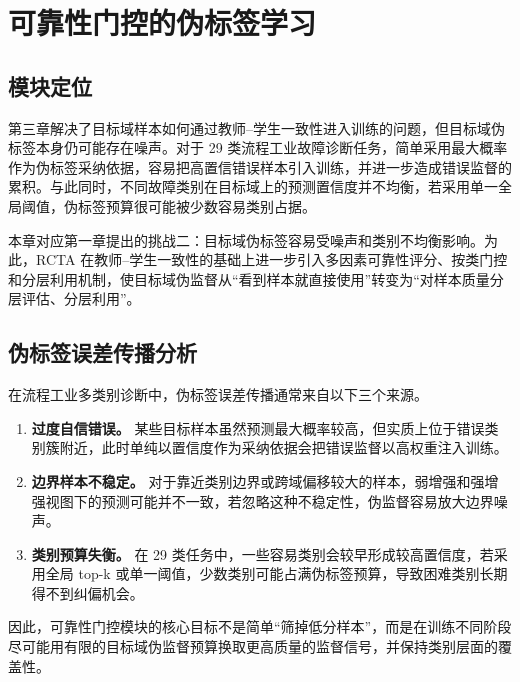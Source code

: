 \chapter{可靠性门控的伪标签学习}

\section{模块定位}
第三章解决了目标域样本如何通过教师--学生一致性进入训练的问题，但目标域伪标签本身仍可能存在噪声。对于 29 类流程工业故障诊断任务，简单采用最大概率作为伪标签采纳依据，容易把高置信错误样本引入训练，并进一步造成错误监督的累积。与此同时，不同故障类别在目标域上的预测置信度并不均衡，若采用单一全局阈值，伪标签预算很可能被少数容易类别占据。

本章对应第一章提出的挑战二：目标域伪标签容易受噪声和类别不均衡影响。为此，RCTA 在教师--学生一致性的基础上进一步引入多因素可靠性评分、按类门控和分层利用机制，使目标域伪监督从“看到样本就直接使用”转变为“对样本质量分层评估、分层利用”。

\section{伪标签误差传播分析}
在流程工业多类别诊断中，伪标签误差传播通常来自以下三个来源。

\begin{enumerate}
\item \textbf{过度自信错误。} 某些目标样本虽然预测最大概率较高，但实质上位于错误类别簇附近，此时单纯以置信度作为采纳依据会把错误监督以高权重注入训练。
\item \textbf{边界样本不稳定。} 对于靠近类别边界或跨域偏移较大的样本，弱增强和强增强视图下的预测可能并不一致，若忽略这种不稳定性，伪监督容易放大边界噪声。
\item \textbf{类别预算失衡。} 在 29 类任务中，一些容易类别会较早形成较高置信度，若采用全局 top-k 或单一阈值，少数类别可能占满伪标签预算，导致困难类别长期得不到纠偏机会。
\end{enumerate}

因此，可靠性门控模块的核心目标不是简单“筛掉低分样本”，而是在训练不同阶段尽可能用有限的目标域伪监督预算换取更高质量的监督信号，并保持类别层面的覆盖性。

